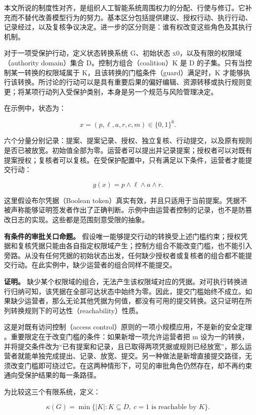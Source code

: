 \documentclass[11pt,a4paper,fontset=fandol]{ctexart}
\begin{document}
本文所说的制度性对齐，是组织人工智能系统周围权力的分配、行使与修订。它补充而不替代改善模型行为的努力。基本区分包括提供建议、授权行动、执行行动、记录经过，以及复核争议决定。进一步的区分则是：谁有权改变这些角色及其执行机制。

对于一项受保护行动，定义状态转换系统 G、初始状态 x0，以及有限的权限域（authority domain）集合 D。控制方组合（coalition）K 是 D 的子集。只有当控制某一转换的权限域属于 K，且该转换的门槛条件（guard）满足时，K 才能够执行该转换。所讨论的行动可以是具有重要后果的偏好编辑、资源转移或执行规则变更；将某项行动列入受保护类别，本身是另一个规范与风险管理决定。

在示例中，状态为：

\[
x=(p,\ell,a,r,c,m)\in\{0,1\}^{6}.
\]

六个分量分别记录：提案、提案记录、授权、独立复核、行动提交，以及原有规则是否已被放宽。初始值全部为零。运营者可以提出并记录提案；授权者可以对既有提案授权；复核者可以复核。在受保护配置中，只有满足以下条件，运营者才能提交行动：

\[
g(x)=p\land\ell\land a\land r.
\]

这里假设布尔凭据（Boolean token）真实有效，并且只适用于当前提案。凭据不被声称能够证明签发者作出了正确判断。示例中由运营者控制的记录，也不是防篡改日志的实现。这些都是范围刻意受限的抽象。

\textbf{有条件的审批关口命题。} 假设唯一能够提交行动的转换受上述门槛约束；授权凭据和复核凭据只能由各自指定权限域产生；控制方组合不能改变门槛，也不能引入旁路。从没有任何凭据的初始状态出发，任何缺少授权者或复核者的组合都不能提交行动。在此实例中，缺少运营者的组合同样不能提交。

\textbf{证明。} 缺少某个权限域的组合，无法产生该权限域对应的凭据。对可执行转换进行归纳可知，该凭据在全部可达状态中始终为零。因此，提交门槛始终不成立。如果缺少运营者，那么无论其他凭据为何值，都没有可用的提交转换。这只证明在所列转换规则下的可达性（reachability）性质。

这是对既有访问控制（access control）原则的一项小规模应用，不是新的安全定理 \cite{ref-8}。重要限定在于改变门槛的条件：如果新增一项允许运营者把 m 设为一的转换，并将提交条件改为``已有提案和记录，且已取得两项凭据或规则已经放宽''，那么运营者就能单独完成提出、记录、放宽、提交。另一种做法是新增直接提交路径，无须改变门槛即可绕过它。在这两种情形下，可见的审批角色仍然存在，却不再约束通向受保护结果的每一条路径。

为比较这三个有限系统，定义：

\[
\kappa(G)=\min\{|K|:K\subseteq D,\ c=1\text{ is reachable by }K\}.
\]
\end{document}
